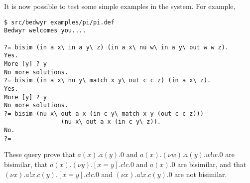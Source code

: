 \documentclass{article}
\begin{document}
It is now possible to test some simple examples in the system.  For
example,
\begin{verbatim}
$ src/bedwyr examples/pi/pi.def
Bedwyr welcomes you....

?= bisim (in a x\ in a y\ z) (in a x\ nu w\ in a y\ out w w z).
Yes.
More [y] ? y
No more solutions.
?= bisim (in a x\ nu y\ match x y\ out c c z) (in a x\ z).
Yes.
More [y] ? y
No more solutions.
?= bisim (nu x\ out a x (in c y\ match x y (out c c z)))
                (nu x\ out a x (in c y\ z)).
No.
?= 
\end{verbatim}
These query prove that 
$a(x).a(y).0$ and $a(x).(\nu w).a(y).w!w.0$ are bisimilar, 
that
$a(x).(\nu y).[x=y].c!c.0$ and $a(x).0$ are bisimilar, and that 
$(\nu x).a!x.c(y).[x=y].c!c.0$ and 
$(\nu x).a!x.c(y).0$ are not bisimilar.

%


\end{document}
